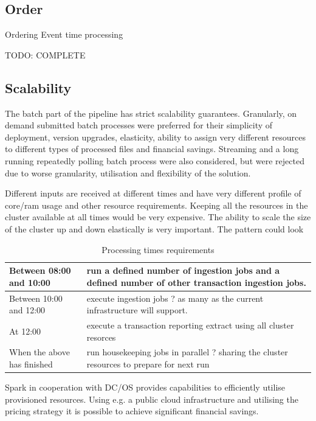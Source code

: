\documentclass[a4paper, 10 pt, conference]{IEEEtran}
\begin{document}
\subsection{Order}
Ordering
Event time processing

TODO: COMPLETE

\subsection{Scalability}
The batch part of the pipeline has strict scalability guarantees. Granularly, on demand submitted batch processes were preferred for their simplicity of deployment, version upgrades, elasticity, ability to assign very different resources to different types of processed files and financial savings. Streaming and a long running repeatedly polling batch process were also considered, but were rejected due to worse granularity, utilisation and flexibility of the solution.

Different inputs are received at different times and have very different profile of core/ram usage and other resource requirements. Keeping all the resources in the cluster available at all times would be very expensive. The ability to scale the size of the cluster up and down elastically is very important. The pattern could look 

\begin{table}[h]
\caption{Processing times requirements}
\label{tbl:processing-times-requirements}
\begin{center}
  \begin{tabular}{ | l | p{3cm} | }
    \hline
    Between 08:00 and 10:00 & run a defined number of ingestion jobs and a defined number of other transaction ingestion jobs.  \\ \hline
    Between 10:00 and 12:00 & execute ingestion jobs ? as many as the current infrastructure will support. \\ \hline
    At 12:00 & execute a transaction reporting extract using all cluster resorces \\ \hline
    When the above has finished & run housekeeping jobs in parallel ? sharing the cluster resources to prepare for next run \\
    \hline
  \end{tabular}
\end{center}
\end{table}

Spark in cooperation with DC/OS provides capabilities to efficiently utilise provisioned resources. Using e.g. a public cloud infrastructure and utilising the pricing strategy it is possible to achieve significant financial savings.
 
\end{document}
